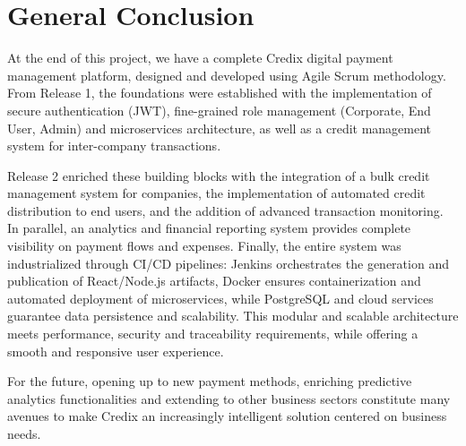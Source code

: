\chapter*{General Conclusion}

At the end of this project, we have a complete Credix digital payment management platform, designed and developed using Agile Scrum methodology. From Release 1, the foundations were established with the implementation of secure authentication (JWT), fine-grained role management (Corporate, End User, Admin) and microservices architecture, as well as a credit management system for inter-company transactions.\par 

Release 2 enriched these building blocks with the integration of a bulk credit management system for companies, the implementation of automated credit distribution to end users, and the addition of advanced transaction monitoring. In parallel, an analytics and financial reporting system provides complete visibility on payment flows and expenses. Finally, the entire system was industrialized through CI/CD pipelines: Jenkins orchestrates the generation and publication of React/Node.js artifacts, Docker ensures containerization and automated deployment of microservices, while PostgreSQL and cloud services guarantee data persistence and scalability. This modular and scalable architecture meets performance, security and traceability requirements, while offering a smooth and responsive user experience.\par

For the future, opening up to new payment methods, enriching predictive analytics functionalities and extending to other business sectors constitute many avenues to make Credix an increasingly intelligent solution centered on business needs.